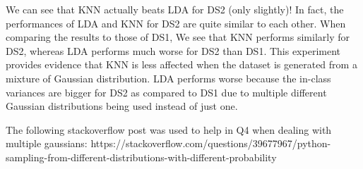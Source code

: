 \documentclass{article}
\begin{document}
We can see that KNN actually beats LDA for DS2 (only slightly)! In fact, the performances of LDA and KNN for DS2 are quite similar to each other. When comparing the results to those of DS1, We see that KNN performs similarly for DS2, whereas LDA performs much worse for DS2 than DS1. This experiment provides evidence that KNN is less affected when the dataset is generated from a mixture of Gaussian distribution. LDA performs worse because the in-class variances are bigger for DS2 as compared to DS1 due to multiple different Gaussian distributions being used instead of just one.

\begin{thebibliography}{9}
The following stackoverflow post was used to help in Q4 when dealing with multiple gaussians: https://stackoverflow.com/questions/39677967/python-sampling-from-different-distributions-with-different-probability
\end{thebibliography}
\end{document}
